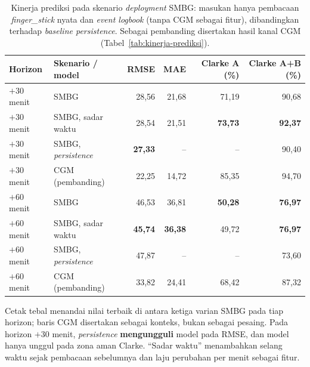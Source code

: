 \begin{table}[htbp]
\centering
\caption{Kinerja prediksi pada skenario \emph{deployment} SMBG: masukan hanya pembacaan \emph{finger\_stick} nyata dan \emph{event logbook} (tanpa CGM sebagai fitur), dibandingkan terhadap \emph{baseline persistence}. Sebagai pembanding disertakan hasil kanal CGM (Tabel~\ref{tab:kinerja-prediksi}).}
\label{tab:smbg-deployment}
\small
\begin{tabular}{@{}llrrrr@{}}
\toprule
\textbf{Horizon} & \textbf{Skenario / model} & \textbf{RMSE} & \textbf{MAE} & \textbf{Clarke A (\%)} & \textbf{Clarke A+B (\%)} \\
\midrule
$+30$ menit & SMBG & 28,56 & 21,68 & 71,19 & 90,68 \\
$+30$ menit & SMBG, sadar waktu & 28,54 & 21,51 & \textbf{73,73} & \textbf{92,37} \\
$+30$ menit & SMBG, \emph{persistence} & \textbf{27,33} & -- & -- & 90,40 \\
$+30$ menit & CGM (pembanding) & 22,25 & 14,72 & 85,35 & 94,70 \\
\midrule
$+60$ menit & SMBG & 46,53 & 36,81 & \textbf{50,28} & \textbf{76,97} \\
$+60$ menit & SMBG, sadar waktu & \textbf{45,74} & \textbf{36,38} & 49,72 & \textbf{76,97} \\
$+60$ menit & SMBG, \emph{persistence} & 47,87 & -- & -- & 73,60 \\
$+60$ menit & CGM (pembanding) & 33,82 & 24,41 & 68,42 & 87,32 \\
\bottomrule
\end{tabular}

\vspace{0.4em}
{\tabnotestyle Cetak tebal menandai nilai terbaik di antara ketiga varian SMBG pada tiap horizon; baris CGM disertakan sebagai konteks, bukan sebagai pesaing. Pada horizon $+30$ menit, \emph{persistence} \textbf{mengungguli} model pada RMSE, dan model hanya unggul pada zona aman Clarke. ``Sadar waktu'' menambahkan selang waktu sejak pembacaan sebelumnya dan laju perubahan per menit sebagai fitur.\par}
\end{table}
